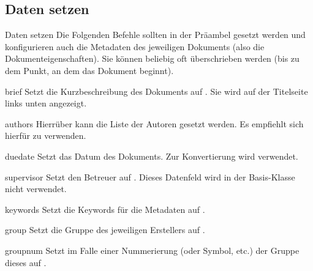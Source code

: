 \documentclass{sopra-seraphim}
\begin{document}
    \subsection{Daten setzen}
    \label{sec:DatenSetzen}
    \begin{frame}{Daten setzen}
        Die Folgenden Befehle sollten in der Präambel gesetzt werden und konfigurieren
        auch die Metadaten des jeweiligen Dokuments (also die Dokumenteigenschaften).
        Sie können beliebig oft überschrieben werden (bis zu dem Punkt, an dem
        das Dokument beginnt). 
        
        \begin{command}{brief}{}
            Setzt die Kurzbeschreibung des Dokuments auf . Sie wird auf der Titelseite links unten angezeigt. 
        \end{command}
        
        \begin{command}{authors}{}
            Hierrüber kann die Liste der Autoren gesetzt werden. Es empfiehlt sich
            hierfür  zu verwenden.
        \end{command}
        
        \begin{command}{duedate}{}
           Setzt das Datum des Dokuments. Zur Konvertierung wird 
           verwendet. 
        \end{command}
        
        \begin{command}{supervisor}{}
            Setzt den Betreuer auf . Dieses Datenfeld wird in der Basis-Klasse nicht verwendet. 
        \end{command}
        
        \begin{command}{keywords}{}
            Setzt die Keywords für die Metadaten auf . 
        \end{command}
        
        \begin{command}{group}{}
            Setzt die Gruppe des jeweiligen Erstellers auf .%
        \end{command}
        
        \begin{command}{groupnum}{}
            Setzt im Falle einer Nummerierung (oder Symbol, etc.) der Gruppe dieses
            auf .
        \end{command}       
    \end{frame}
    
\end{document}
